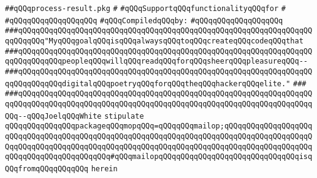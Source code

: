 \label{src/lib/std/src/threadkit/process-result.api}
\verb|##qQQqprocess-result.pkg|\newline
\verb|#|\newline
\verb|#qQQqSupportqQQqfunctionalityqQQqfor|\newline
\verb|#|\newline
\verb|#qQQqqQQqqQQqqQQqqQQq|\newline
\newline
\verb|#qQQqCompiledqQQqby:|\newline
\verb|#qQQqqQQqqQQqqQQqqQQq|\newline
\newline
\newline
\newline
\verb|###qQQqqQQqqQQqqQQqqQQqqQQqqQQqqQQqqQQqqQQqqQQqqQQqqQQqqQQqqQQqqQQqqQQqqQQqqQQq"MyqQQqgoalqQQqisqQQqalwaysqQQqtoqQQqcreateqQQqcodeqQQqthat|\newline
\verb|###qQQqqQQqqQQqqQQqqQQqqQQqqQQqqQQqqQQqqQQqqQQqqQQqqQQqqQQqqQQqqQQqqQQqqQQqqQQqqQQqpeopleqQQqwillqQQqreadqQQqforqQQqsheerqQQqpleasureqQQq--|\newline
\verb|###qQQqqQQqqQQqqQQqqQQqqQQqqQQqqQQqqQQqqQQqqQQqqQQqqQQqqQQqqQQqqQQqqQQqqQQqqQQqqQQqdigitalqQQqpoetryqQQqforqQQqtheqQQqhackerqQQqelite."|\newline
\verb|###|\newline
\verb|###qQQqqQQqqQQqqQQqqQQqqQQqqQQqqQQqqQQqqQQqqQQqqQQqqQQqqQQqqQQqqQQqqQQqqQQqqQQqqQQqqQQqqQQqqQQqqQQqqQQqqQQqqQQqqQQqqQQqqQQqqQQqqQQqqQQqqQQqqQQq--qQQqJoelqQQqWhite|\newline
\newline
\newline
\newline
\verb|stipulate|\newline
\verb|qQQqqQQqqQQqqQQqpackageqQQqmopqQQq=qQQqqQQqmailop;qQQqqQQqqQQqqQQqqQQqqQQqqQQqqQQqqQQqqQQqqQQqqQQqqQQqqQQqqQQqqQQqqQQqqQQqqQQqqQQqqQQqqQQqqQQqqQQqqQQqqQQqqQQqqQQqqQQqqQQqqQQqqQQqqQQqqQQqqQQqqQQqqQQqqQQqqQQqqQQqqQQqqQQqqQQqqQQqqQQqqQQq#qQQqmailopqQQqqQQqqQQqqQQqqQQqqQQqqQQqqQQqisqQQqfromqQQqqQQqqQQq|\newline
\verb|herein|\newline
\newline
